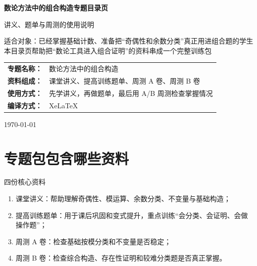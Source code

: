 \documentclass[11pt,a4paper,fontset=fandol]{ctexart}
\begin{document}
\thispagestyle{empty}
\begin{titlepage}
\centering
\vspace*{0.9cm}

\begin{tcolorbox}[
  enhanced,
  width=0.92\textwidth,
  colback=white,
  colframe=mainblue,
  boxrule=1pt,
  arc=0mm,
  left=6mm,
  right=6mm,
  top=8mm,
  bottom=8mm
]
\centering

{\fontsize{24}{30}\selectfont\bfseries 数论方法中的组合构造专题目录页\par}
\vspace{0.65cm}
{\fontsize{17}{22}\selectfont 讲义、题单与周测的使用说明\par}

\vspace{1cm}
\begin{tcolorbox}[colback=lightblue,colframe=mainblue,width=0.84\textwidth,boxrule=1pt]
\centering
{\large 适合对象：已经掌握基础计数、准备把“奇偶性和余数分类”真正用进组合题的学生}\\[0.35em]
{\normalsize 本目录页帮助把“数论工具进入组合证明”的资料串成一个完整训练包}
\end{tcolorbox}

\vspace{1.0cm}
\renewcommand{\arraystretch}{1.42}
\begin{tabular}{>{\bfseries}p{3.5cm}p{8cm}}
专题名称： & 数论方法中的组合构造 \\
资料组成： & 课堂讲义、提高训练题单、周测 A 卷、周测 B 卷 \\
使用方式： & 先学讲义，再做题单，最后用 A/B 周测检查掌握情况 \\
编译方式： & XeLaTeX \\
\end{tabular}

\vspace{0.9cm}
{\large \today\par}
\end{tcolorbox}
\end{titlepage}

\tableofcontents
\newpage

\section{专题包包含哪些资料}

\begin{goalbox}{四份核心资料}
\begin{enumerate}
  \item 课堂讲义：帮助理解奇偶性、模运算、余数分类、不变量与基础构造；
  \item 提高训练题单：用于课后巩固和变式提升，重点训练“会分类、会证明、会做操作题”；
  \item 周测 A 卷：检查基础按模分类和不变量是否稳定；
  \item 周测 B 卷：检查综合构造、存在性证明和较难分类题是否真正掌握。
\end{enumerate}
\end{goalbox}
\end{document}
